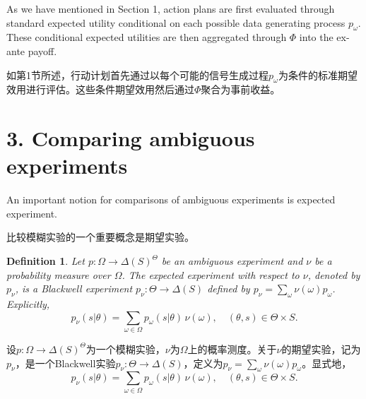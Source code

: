 \documentclass[12pt,a4paper]{article}
\newenvironment{original}
  {\par\vspace{4pt}\noindent\color{black}\ignorespaces}
  {\par\vspace{2pt}}
\newenvironment{translation}
  {\par\vspace{2pt}\noindent\color{myblue}\ignorespaces}
  {\par\vspace{6pt}}
\newcommand{\bisection}[2]{%
  \section{#1}%
  \vspace{-2pt}%
  \noindent{\color{myblue}\large\bfseries #2}%
  \vspace{6pt}%
}
\newtheorem{definition}[theorem]{Definition}
\newcommand{\Delt}{\Delta}
\begin{document}
\begin{original}
As we have mentioned in Section 1, action plans are first evaluated through standard expected utility conditional on each possible data generating process $p_{\omega}$. These conditional expected utilities are then aggregated through $\Phi$ into the ex-ante payoff.
\end{original}

\begin{translation}
如第1节所述，行动计划首先通过以每个可能的信号生成过程$p_{\omega}$为条件的标准期望效用进行评估。这些条件期望效用然后通过$\Phi$聚合为事前收益。
\end{translation}



\bisection{3. Comparing ambiguous experiments}{3. 模糊实验的比较}

\begin{original}
An important notion for comparisons of ambiguous experiments is expected experiment.
\end{original}

\begin{translation}
比较模糊实验的一个重要概念是期望实验。
\end{translation}

\begin{definition}
Let $p:\Omega\to\Delt(S)^{\Theta}$ be an ambiguous experiment and $\nu$ be a probability measure over $\Omega$. The expected experiment with respect to $\nu$, denoted by $p_{\nu}$, is a Blackwell experiment $p_{\nu}:\Theta\to\Delt(S)$ defined by $p_{\nu}=\sum_{\omega}\nu(\omega)p_{\omega}$. Explicitly,
\begin{equation}
    p_{\nu}(s|\theta) = \sum_{\omega\in\Omega} p_{\omega}(s|\theta)\,\nu(\omega), \quad (\theta,s)\in\Theta\times S. \label{eq:expected}
\end{equation}
\end{definition}

\begin{translation}
设$p:\Omega\to\Delt(S)^{\Theta}$为一个模糊实验，$\nu$为$\Omega$上的概率测度。关于$\nu$的期望实验，记为$p_{\nu}$，是一个Blackwell实验$p_{\nu}:\Theta\to\Delt(S)$，定义为$p_{\nu}=\sum_{\omega}\nu(\omega)p_{\omega}$。显式地，
\begin{equation}
    p_{\nu}(s|\theta) = \sum_{\omega\in\Omega} p_{\omega}(s|\theta)\,\nu(\omega), \quad (\theta,s)\in\Theta\times S. \label{eq:expected}
\end{equation}
\end{translation}
\end{document}
